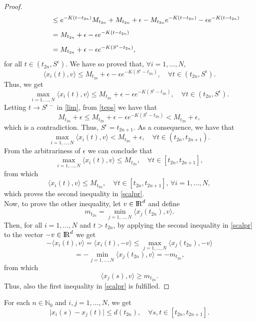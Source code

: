 \documentclass[a4paper,11pt,oneside]{article}
\newcommand{\RR}{{{\rm I} \kern -.15em {\rm R} }}
\begin{document}
\begin{proof}
$$\begin{array}{l}
			\vspace{0.3cm}\displaystyle{\hspace{1.7 cm}
				\leq e^{-K(t-t_{2n})}M_{t_{2n}}+M_{t_{2n}}+\epsilon -M_{t_{2n}}e^{-K(t-t_{2n})}-\epsilon e^{-K(t-t_{2n})}}\\
			\vspace{0.3cm}\displaystyle{\hspace{1.7 cm}
				=M_{t_{2n}}+\epsilon-\epsilon e^{-K(t-t_{2n})}}\\
			\displaystyle{\hspace{1.7 cm}
				=M_{t_{2n}}+\epsilon-\epsilon e^{-K(S^{\epsilon}-t_{2n})},}
		\end{array}
		$$for all $t\in (t_{2n}, S^{\epsilon})$.	We have so proved that, $\forall i=1,\dots, N,$
		$$\langle x_{i}(t),v\rangle\leq M_{t_{2n}}+\epsilon-\epsilon e^{-K(S^{\epsilon}-t_{2n})}, \quad \forall t\in (t_{2n},S^{\epsilon}).$$
		Thus, we get
		\begin{equation}\label{lim}
			\max_{i=1,\dots,N} \langle x_{i}(t),v\rangle\leq M_{t_{2n}}+\epsilon-\epsilon e^{-K(S^{\epsilon}-t_{2n})}, \quad \forall t\in (t_{2n},S^{\epsilon}).
		\end{equation}
		Letting $t\to S^{\epsilon-}$ in \eqref{lim}, from \eqref{teps} we have that $$M_{t_{2n}}+\epsilon\leq M_{t_{2n}}+\epsilon-\epsilon e^{-K(S^{\epsilon}-t_{2n})}<M_{t_{2n}}+\epsilon,$$
		which is a contradiction. Thus, $S^{\epsilon}=t_{2n+1}$. As a consequence, we have that $$\max_{i=1,\dots,N}\langle x_{i}(t),v\rangle<M_{t_{2n}}+\epsilon, \quad \forall t\in (t_{2n},t_{2n+1}).$$
		From the arbitrariness of $\epsilon$ we can conclude that $$\max_{i=1,\dots,N}\langle x_{i}(t),v\rangle\leq M_{t_{2n}}, \quad \forall t\in [t_{2n},t_{2n+1}],$$
		from which $$\langle x_{i}(t),v\rangle\leq M_{t_{2n}}, \quad \forall t\in [t_{2n},t_{2n+1}], \,\forall i=1,\dots,N,$$
		which proves the second inequality in \eqref{scalpr}.
		\\Now, to prove the other inequality, let $v\in \RR^{d}$ and define $$m_{t_{2n}}=\min_{j=1,\dots,N}\langle x_{j}(t_{2n}),v\rangle.$$
		Then, for all $i=1,\dots,N$ and $t>t_{2n}$, by applying the second inequality in \eqref{scalpr} to the vector $-v\in\RR^{d}$ we get $$-\langle x_{i}(t),v\rangle=\langle x_{i}(t),-v\rangle\leq \max_{j=1,\dots,N}\langle x_{j}(t_{2n}),-v\rangle$$$$=-\min_{j=1,\dots,N}\langle x_{j}(t_{2n}),v\rangle=-m_{t_{2n}},$$
		from which $$\langle x_{j}(s),v\rangle\geq m_{t_{2n}}.$$
		Thus, also the first inequality in \eqref{scalpr} is fulfilled.
	\end{proof}
 \begin{lem}\label{L2}
		For each $n\in \mathbb{N}_{0}$ and $i,j=1,\dots,N$, we get \begin{equation}
			\label{dist}
			\lvert x_{i}(s)-x_{j}(t)\rvert\leq d(t_{2n}), \quad\forall s,t\in [t_{2n},t_{2n+1}].
		\end{equation} 
	\end{lem}
\end{document}
